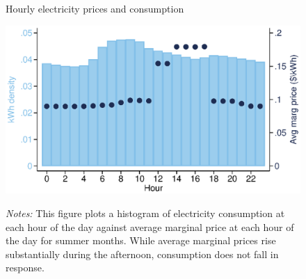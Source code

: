 \begin{figure}[t]
\begin{centering}
\caption{Hourly electricity prices and consumption}
\label{fig:hourly_consumption_vs_price}
\includegraphics[trim={0 10mm 0 10mm},clip,width=.97\textwidth]{Figures/hourly_hist_prices_pooled_summer.eps}
\caption*{\scriptsize \emph{Notes:} This figure plots a histogram of electricity consumption at each hour of the day against average marginal price at each hour of the day for summer months. While average marginal prices rise substantially during the afternoon, consumption does not fall in response.}
\end{centering}
\end{figure}
